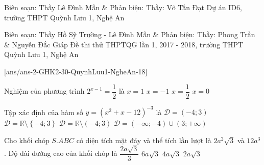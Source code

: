\begin{name}
{Biên soạn: Thầy Lê Đình Mẫn \& Phản biện: Thầy: Võ Tấn Đạt}
{Dự án ID6, trường THPT Quỳnh Lưu 1, Nghệ An}
\end{name}
\begin{name}
{Biên soạn: Thầy Hồ Sỹ Trường - Lê Đình Mẫn \& Phản biện: Thầy: Phong Trần \& Nguyễn Đắc Giáp}
{Đề thi thử THPTQG lần 1, 2017 - 2018, trường THPT Quỳnh Lưu 1, Nghệ An}
\end{name}
\setcounter{ex}{0}
[ans/ans-2-GHK2-30-QuynhLuu1-NgheAn-18]
\begin{ex}%
	Nghiệm của phương trình $2^{x-1}=\dfrac{1}{2}$ là
	\choice
	{$x=1$}
	{$x=-1$}
	{$x=\dfrac{1}{2}$}
	{\True $x=0$}
\end{ex}

\begin{ex}%
	Tập xác định của hàm số $y=\left(x^2+x-12\right)^{-3}$ là
	\choice
	{$\mathscr D = \left(-4;3\right)$}
	{\True $\mathscr D=\mathbb{R}\setminus \left\{-4;3\right\}$}
	{$\mathscr D=\mathbb{R} \setminus \left(-4;3\right)$}
	{$\mathscr D=\left(-\infty;-4\right)\cup \left(3;+\infty\right)$}
\end{ex}


\begin{ex}%
	Cho khối chóp $S.ABC$ có diện tích mặt đáy và thể tích lần lượt là $2a^2\sqrt{3}$ và $12a^3$. Độ dài đường cao của khối chóp là
	\choice
	{$\dfrac{2a\sqrt{3}}{3}$}
	{\True $6a\sqrt{3}$}
	{$4a\sqrt{3}$}
	{$2a\sqrt{3}$}
\end{ex}

